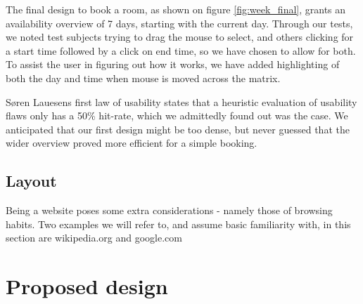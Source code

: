 The final design to book a room, as shown on figure \ref{fig:week_final}, grants an availability overview of 7 days, starting with the current day. Through our tests, we noted test subjects trying to drag the mouse to select, and others clicking for a start time followed by a click on end time, so we have chosen to allow for both.
To assist the user in figuring out how it works, we have added highlighting of both the day and time when mouse is moved across the matrix.

Søren Lauesens first law of usability\cite{lauesen} states that a heuristic evaluation of usability flaws only has a 50\% hit-rate, which we admittedly found out was the case. We anticipated that our first design might be too dense, but never guessed that the wider overview proved more efficient for a simple booking.


\subsection{Layout}
Being a website poses some extra considerations - namely those of browsing habits. Two examples we will refer to, and assume basic familiarity with, in this section are wikipedia.org and google.com


\section{Proposed design}
\label{sec:proposed_design}
